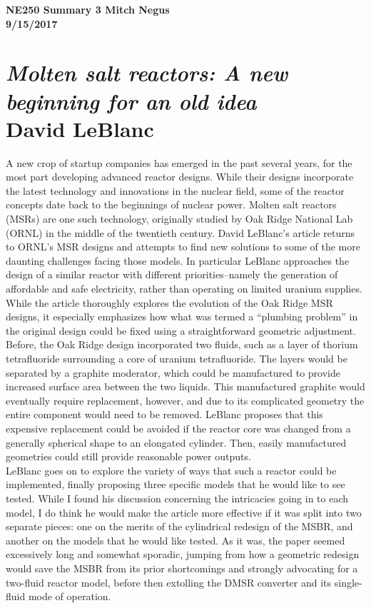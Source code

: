 \documentclass{report}
\newcommand{\tab}{\-\hspace{1cm}}
\begin{document}
\thispagestyle{empty}

{\bf {\large {NE250 Summary {3} \hfill Mitch Negus\\
		\hspace*{\fill} 9/15/2017\\ }}}
\section*{\textsl{Molten salt reactors: A new beginning for an old idea} \\ \normalsize David LeBlanc}

\tab A new crop of startup companies has emerged in the past several years, for the most part developing advanced reactor designs. While their designs incorporate the latest technology and innovations in the nuclear field, some of the reactor concepts date back to the beginnings of nuclear power. Molten salt reactors (MSRs) are one such technology, originally studied by Oak Ridge National Lab (ORNL) in the middle of the twentieth century. David LeBlanc's article returns to ORNL's MSR designs and attempts to find new solutions to some of the more daunting challenges facing those models. In particular LeBlanc approaches the design of a similar reactor with different priorities--namely the generation of affordable and safe electricity, rather than operating on limited uranium supplies.\\
\tab While the article thoroughly explores the evolution of the Oak Ridge MSR designs, it especially emphasizes how what was termed a ``plumbing problem'' in the original design could be fixed using a straightforward geometric adjustment. Before, the Oak Ridge design incorporated two fluids, such as a layer of thorium tetrafluoride surrounding a core of uranium tetrafluoride. The layers would be separated by a graphite moderator, which could be manufactured to provide increased surface area between the two liquids. This manufactured graphite would eventually require replacement, however, and due to its complicated geometry the entire component would need to be removed. LeBlanc proposes that this expensive replacement could be avoided if the reactor core was changed from a generally spherical shape to an elongated cylinder. Then, easily manufactured geometries could still provide reasonable power outputs.\\
\tab LeBlanc goes on to explore the variety of ways that such a reactor could be implemented, finally proposing three specific models that he would like to see tested. While I found his discussion concerning the intricacies going in to each model, I do think he would make the article more effective if it was split into two separate pieces: one on the merits of the cylindrical redesign of the MSBR, and another on the models that he would like tested. As it was, the paper seemed excessively long and somewhat sporadic, jumping from how a geometric redesign would save the MSBR from its prior shortcomings and strongly advocating for a two-fluid reactor model, before then extolling the DMSR converter and its single-fluid mode of operation.
\end{document}
